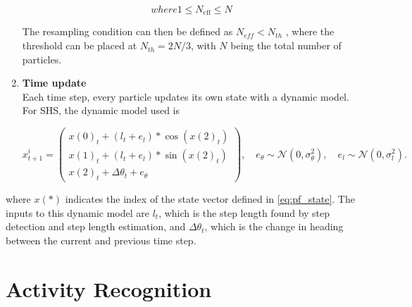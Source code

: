 \begin{enumerate}
\begin{subequations}
		where
		
		\begin{equation}
		1 \leq N_{\mathrm{cff}} \leq N
		\end{equation}
	\end{subequations}
	
	The resampling condition can then be defined as $N_{eff} < N_{th}$ \cite{gustafsson2010statistical}, where the threshold can be placed at $N_{th} = 2N/3$, with $N$ being the total number of particles.
	
	
	\item \textbf{Time update} \\	
	Each time step, every particle updates its own state with a dynamic model. For SHS, the dynamic model used is
	
	\begin{equation}
	\label{eq:SHS_dynamic_model_with_noise}
	x^i_{t + 1}
	=
	\left(\begin{array}{l}
	x(0)_{t} + (l_{t} + e_l) * \cos (x(2)_{t}) \\
	x(1)_{t} + (l_{t} + e_l) * \sin (x(2)_{t}) \\
	x(2)_{t} + \Delta \theta_t + e_\theta 
	\end{array}\right), \quad
	e_{\theta} \sim \mathcal{N}\left(0, \sigma_{\theta}^{2}\right), \quad e_{l} \sim \mathcal{N}\left(0, \sigma_{l}^{2}\right).
	\end{equation}
\end{enumerate}

where $x(*)$ indicates the index of the state vector defined in \cref{eq:pf_state}. The inputs to this dynamic model are $l_{t}$, which is the step length found by step detection and step length estimation, and $\Delta \theta_t$, which is the change in heading between the current and previous time step.

\section{Activity Recognition}